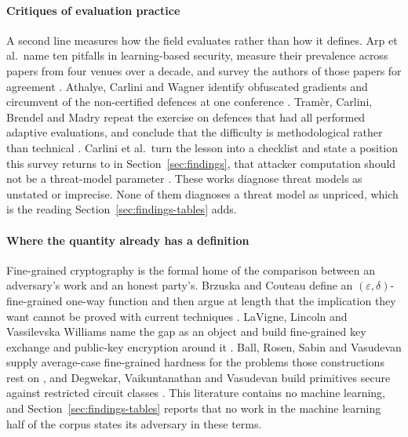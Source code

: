 \paragraph{Critiques of evaluation practice}
A second line measures how the field evaluates rather than how it defines. Arp et
al.\ name ten pitfalls in learning-based security, measure their prevalence across
\DDpapers{} papers from four venues over a decade, and survey the authors of those
papers for agreement \cite{AQPWPWCR22}. Athalye, Carlini and Wagner identify
obfuscated gradients and circumvent \OGobfuscated{} of the \OGpopulation{}
non-certified defences at one conference \cite{ACW18}. Tram\`er, Carlini, Brendel and
Madry repeat the exercise on \AAdefences{} defences that had all performed
adaptive evaluations, and conclude that the difficulty is methodological rather than
technical \cite{TCBM20}. Carlini et al.\ turn the lesson into a checklist and state a
position this survey returns to in Section~\ref{sec:findings}, that attacker
computation should not be a threat-model parameter \cite{CAPBRTGMK19}. These works
diagnose threat models as unstated or imprecise. None of them diagnoses a threat
model as unpriced, which is the reading Section~\ref{sec:findings-tables} adds.

\paragraph{Where the quantity already has a definition}
Fine-grained cryptography is the formal home of the comparison between an
adversary's work and an honest party's. Brzuska and Couteau define an
$(\varepsilon,\delta)$-fine-grained one-way function and then argue at length that
the implication they want cannot be proved with current techniques \cite{BC22}.
LaVigne, Lincoln and Vassilevska Williams name the gap as an object and build
fine-grained key exchange and public-key encryption around it \cite{LLW19}. Ball,
Rosen, Sabin and Vasudevan supply average-case fine-grained hardness for the
problems those constructions rest on \cite{BRSV17}, and Degwekar, Vaikuntanathan and
Vasudevan build primitives secure against restricted circuit classes \cite{DVV16}.
This literature contains no machine learning, and Section~\ref{sec:findings-tables} reports
that no work in the machine learning half of the corpus states its adversary in
these terms.

